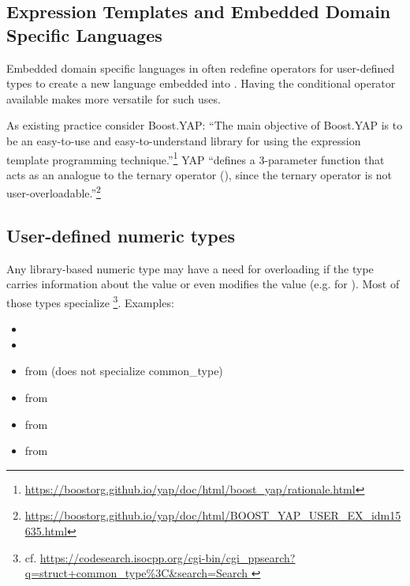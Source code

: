 \subsection{Expression Templates and Embedded Domain Specific Languages}
Embedded domain specific languages in \CC{} often redefine operators for user-defined types to create a new language embedded into \CC{}.
Having the conditional operator available makes \CC{} more versatile for such uses.

As existing practice consider Boost.YAP:
“The main objective of Boost.YAP is to be an easy-to-use and easy-to-understand library for using the expression template programming technique.”\footnote{\url{https://boostorg.github.io/yap/doc/html/boost_yap/rationale.html}}
YAP “defines a 3-parameter function  that acts as an analogue to the ternary operator (), since the ternary operator is not user-overloadable.”\footnote{\url{https://boostorg.github.io/yap/doc/html/BOOST_YAP_USER_EX_idm15635.html}}

\subsection{User-defined numeric types}
Any library-based numeric type may have a need for overloading  if the type carries information about the value or even modifies the value (e.g. for ).
Most of those types specialize \footnote{cf. \url{https://codesearch.isocpp.org/cgi-bin/cgi_ppsearch?q=struct+common_type\%3C&search=Search
}}.
Examples:
\begin{itemize}
  \item {}
  \item {}
  \item {} from \textcite{P1438R1} (does not specialize common_type)
  \item {} from \textcite{P1050R0}
  \item {} from \textcite{P0037R5}
  \item {} from \textcite{site.bounded-integer}
\end{itemize}


